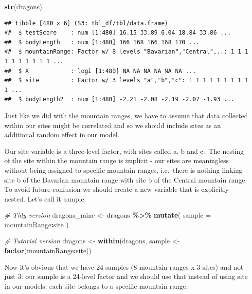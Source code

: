 \documentclass[
]{article}
\newenvironment{Shaded}{\begin{snugshade}}{\end{snugshade}}
\newcommand{\AttributeTok}[1]{\textcolor[rgb]{0.13,0.29,0.53}{#1}}
\newcommand{\CommentTok}[1]{\textcolor[rgb]{0.56,0.35,0.01}{\textit{#1}}}
\newcommand{\FunctionTok}[1]{\textcolor[rgb]{0.13,0.29,0.53}{\textbf{#1}}}
\newcommand{\NormalTok}[1]{#1}
\newcommand{\OtherTok}[1]{\textcolor[rgb]{0.56,0.35,0.01}{#1}}
\newcommand{\SpecialCharTok}[1]{\textcolor[rgb]{0.81,0.36,0.00}{\textbf{#1}}}
\begin{document}
\begin{Shaded}
\begin{Highlighting}[]
\FunctionTok{str}\NormalTok{(dragons)}
\end{Highlighting}
\end{Shaded}

\begin{verbatim}
## tibble [480 x 6] (S3: tbl_df/tbl/data.frame)
##  $ testScore    : num [1:480] 16.15 33.89 6.04 18.84 33.86 ...
##  $ bodyLength   : num [1:480] 166 168 166 168 170 ...
##  $ mountainRange: Factor w/ 8 levels "Bavarian","Central",..: 1 1 1 1 1 1 1 1 1 1 ...
##  $ X            : logi [1:480] NA NA NA NA NA NA ...
##  $ site         : Factor w/ 3 levels "a","b","c": 1 1 1 1 1 1 1 1 1 1 ...
##  $ bodyLength2  : num [1:480] -2.21 -2.08 -2.19 -2.07 -1.93 ...
\end{verbatim}

Just like we did with the mountain ranges, we have to assume that data
collected within our sites might be correlated and so we should include
sites as an additional random effect in our model.

Our site variable is a three-level factor, with sites called a, b and
c.~The nesting of the site within the mountain range is implicit - our
sites are meaningless without being assigned to specific mountain
ranges, i.e.~there is nothing linking site b of the Bavarian mountain
range with site b of the Central mountain range. To avoid future
confusion we should create a new variable that is explicitly nested.
Let's call it sample:

\begin{Shaded}
\begin{Highlighting}[]
\CommentTok{\# Tidy version}
\NormalTok{dragons\_mine }\OtherTok{\textless{}{-}}\NormalTok{ dragons }\SpecialCharTok{\%\textgreater{}\%} 
  \FunctionTok{mutate}\NormalTok{(}
    \AttributeTok{sample =}\NormalTok{ mountainRange}\SpecialCharTok{:}\NormalTok{site}
\NormalTok{  )}

\CommentTok{\# Tutorial version}
\NormalTok{dragons }\OtherTok{\textless{}{-}} \FunctionTok{within}\NormalTok{(dragons, sample }\OtherTok{\textless{}{-}} \FunctionTok{factor}\NormalTok{(mountainRange}\SpecialCharTok{:}\NormalTok{site))}
\end{Highlighting}
\end{Shaded}

Now it's obvious that we have 24 samples (8 mountain ranges x 3 sites)
and not just 3: our sample is a 24-level factor and we should use that
instead of using site in our models: each site belongs to a specific
mountain range.
\end{document}
